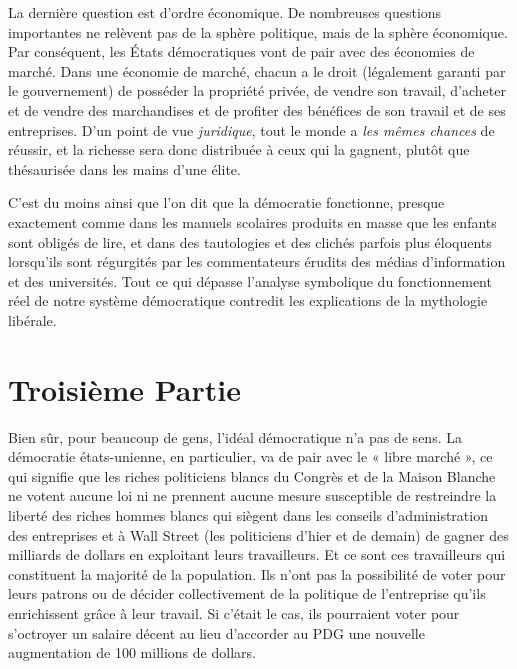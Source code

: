 La dernière question est d'ordre économique. De nombreuses questions importantes ne relèvent pas de la sphère politique, mais de la sphère économique. Par conséquent, les États démocratiques vont de pair avec des économies de marché. Dans une économie de marché, chacun a le droit (légalement garanti par le gouvernement) de posséder la propriété privée, de vendre son travail, d'acheter et de vendre des marchandises et de profiter des bénéfices de son travail et de ses entreprises. D'un point de vue \emph{juridique}, tout le monde a \emph{les mêmes chances} de réussir, et la richesse sera donc distribuée à ceux qui la gagnent, plutôt que thésaurisée dans les mains d'une élite.

C'est du moins ainsi que l'on dit que la démocratie fonctionne, presque exactement comme dans les manuels scolaires produits en masse que les enfants sont obligés de lire, et dans des tautologies et des clichés parfois plus éloquents lorsqu'ils sont régurgités par les commentateurs érudits des médias d'information et des universités. Tout ce qui dépasse l'analyse symbolique du fonctionnement réel de notre système démocratique contredit les explications de la mythologie libérale.

\chapter*{\textbf{Troisième Partie}}\hypertarget{troisime-partie}{}\label{troisime-partie}

Bien sûr, pour beaucoup de gens, l'idéal démocratique n'a pas de sens. La démocratie états-unienne, en particulier, va de pair avec le « libre marché », ce qui signifie que les riches politiciens blancs du Congrès et de la Maison Blanche ne votent aucune loi ni ne prennent aucune mesure susceptible de restreindre la liberté des riches hommes blancs qui siègent dans les conseils d'administration des entreprises et à Wall Street (les politiciens d'hier et de demain) de gagner des milliards de dollars en exploitant leurs travailleurs. Et ce sont ces travailleurs qui constituent la majorité de la population. Ils n'ont pas la possibilité de voter pour leurs patrons ou de décider collectivement de la politique de l'entreprise qu'ils enrichissent grâce à leur travail. Si c'était le cas, ils pourraient voter pour s'octroyer un salaire décent au lieu d'accorder au PDG une nouvelle augmentation de 100 millions de dollars.

